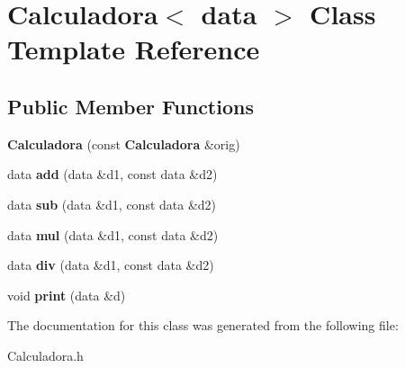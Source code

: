 \section{Calculadora$<$ data $>$ Class Template Reference}
\label{class_calculadora}
\subsection*{Public Member Functions}
\begin{DoxyCompactItemize}
\item 
\label{class_calculadora_a878963f2a1b0c9c586c3872158a25267} 
{\bfseries Calculadora} (const {\bf Calculadora} \&orig)
\item 
\label{class_calculadora_a05dcd61b28120faedfb6dbbd65463af6} 
data {\bfseries add} (data \&d1, const data \&d2)
\item 
\label{class_calculadora_aec3d8e1acaa2b0268c0b07d7154d0e40} 
data {\bfseries sub} (data \&d1, const data \&d2)
\item 
\label{class_calculadora_aa032b0fd70acc7307e9a54d028e9a5b4} 
data {\bfseries mul} (data \&d1, const data \&d2)
\item 
\label{class_calculadora_a4b7c80675555ce2ad393d6572634672b} 
data {\bfseries div} (data \&d1, const data \&d2)
\item 
\label{class_calculadora_a49ad8020c1eae50b024b5fa3ba89a38d} 
void {\bfseries print} (data \&d)
\end{DoxyCompactItemize}


The documentation for this class was generated from the following file\+:\begin{DoxyCompactItemize}
\item 
Calculadora.\+h\end{DoxyCompactItemize}
